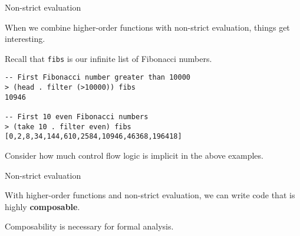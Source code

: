 %
\begin{frame}[fragile]{Non-strict evaluation}

When we combine higher-order functions with non-strict evaluation, things get
interesting. 

Recall that \texttt{fibs} is our infinite list of Fibonacci numbers.

\begin{block}{}
\begin{verbatim}
-- First Fibonacci number greater than 10000
> (head . filter (>10000)) fibs
10946

-- First 10 even Fibonacci numbers
> (take 10 . filter even) fibs
[0,2,8,34,144,610,2584,10946,46368,196418]
\end{verbatim}
\end{block}

Consider how much control flow logic is implicit in the above examples.

\end{frame}

%
\begin{frame}[fragile]{Non-strict evaluation}

With higher-order functions and non-strict evaluation, we can write code that is
highly \textbf{composable}.

Composability is necessary for formal analysis.

\end{frame}

